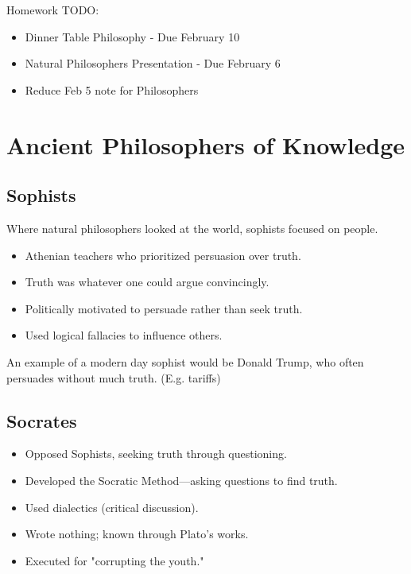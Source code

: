 

Homework TODO:
\begin{itemize}
    \item Dinner Table Philosophy - Due February 10
    \item Natural Philosophers Presentation - Due February 6
    \item Reduce Feb 5 note for Philosophers
\end{itemize}

\section{Ancient Philosophers of Knowledge}

\subsection{Sophists}

Where natural philosophers looked at the world, sophists focused on people.

\begin{itemize}
    \item Athenian teachers who prioritized persuasion over truth.
    \item Truth was whatever one could argue convincingly.
    \item Politically motivated to persuade rather than seek truth.
    \item Used logical fallacies to influence others.
\end{itemize}

An example of a modern day sophist would be Donald Trump, who often persuades
without much truth. (E.g. tariffs)

\subsection{Socrates}

\begin{itemize}
    \item Opposed Sophists, seeking truth through questioning.
    \item Developed the Socratic Method—asking questions to find truth.
    \item Used dialectics (critical discussion).
    \item Wrote nothing; known through Plato’s works.
    \item Executed for "corrupting the youth."
\end{itemize}

